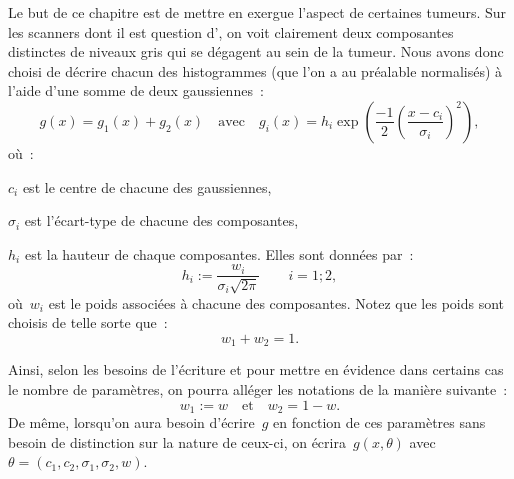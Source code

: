 \documentclass[main.tex]{subfiles}
\begin{document}
Le but de ce chapitre est de mettre en exergue l'aspect \heterogene de certaines tumeurs. Sur les scanners dont il est question d'\hetero, on voit clairement deux composantes distinctes de niveaux gris qui se dégagent au sein de la tumeur. Nous avons donc choisi de décrire chacun des histogrammes (que l'on a au préalable normalisés) à l'aide d'une somme de deux gaussiennes~:
\begin{equation}
\label{eq:decomp_gaussienne}
g(x) = g_1(x)+g_2(x) \quad \textrm{avec} \quad g_i(x) = h_i\exp \left(\frac{-1}{2} \left( \dfrac{x-c_i}{\sigma_i}\right)^2  \right),
\end{equation}
où~:
\begin{myitemize}
\item $c_i$ est le centre de chacune des gaussiennes,
\item $\sigma_i$ est l'écart-type de chacune des composantes,
\item $h_i$ est la hauteur de chaque composantes. Elles sont données par~:
\begin{equation}
\label{eq:hauteur_gaussienne}
h_i := \dfrac{w_i}{\sigma_i \sqrt{2\pi}} \qquad i=1;2,
\end{equation}
où~$w_i$ est le poids associées à chacune des composantes. Notez que les poids sont choisis de telle sorte que~:
\begin{equation}
w_1+w_2=1.
\end{equation}
\end{myitemize}
Ainsi, selon les besoins de l'écriture et pour mettre en évidence dans certains cas le nombre de paramètres, on pourra alléger les notations de la manière suivante~:
\begin{equation}
\label{eq:renomage_w}
w_1 := w \quad \textrm{et} \quad w_2 = 1 - w.
\end{equation}
De même, lorsqu'on aura besoin d'écrire~$g$ en fonction de ces paramètres sans besoin de distinction sur la nature de ceux-ci, on écrira~$g(x,\theta)$ avec~$\theta =( c_1,c_2,\sigma_1,\sigma_2,w  )$.
\end{document}
